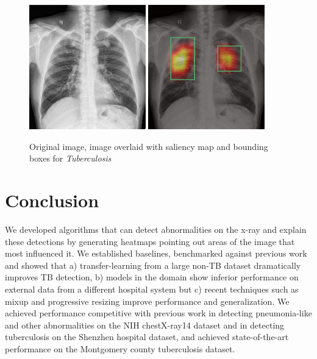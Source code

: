\documentclass[12pt,oneside,a4paper]{report}
\begin{document}
\begin{figure}[H]
  \centering
  \includegraphics[width=0.45\textwidth]{images/preds/TB2}\hspace{0.01\textwidth}%
  \includegraphics[width=0.45\textwidth]{images/preds/TB2_cam}\\[0.01\textwidth]
  \caption{Original image, image overlaid with saliency map and bounding boxes
    for \emph{Tuberculosis}}
  \label{examples_17}
\end{figure}



\chapter{Conclusion}
We developed algorithms that can detect abnormalities on the x-ray and explain
these detections by generating heatmaps pointing out areas of the image that
most influenced it. We established baselines, benchmarked against previous work
and showed that a) transfer-learning from a large non-TB dataset dramatically
improves TB detection, b) models in the domain show inferior performance on
external data from a different hospital system but c) recent techniques such as
mixup and progressive resizing improve performance and generalization. We
achieved performance competitive with previous work in detecting pneumonia-like
and other abnormalities on the NIH chestX-ray14 dataset and in detecting
tuberculosis on the Shenzhen hospital dataset, and achieved state-of-the-art
performance on the Montgomery county tuberculosis dataset.\\
\end{document}
